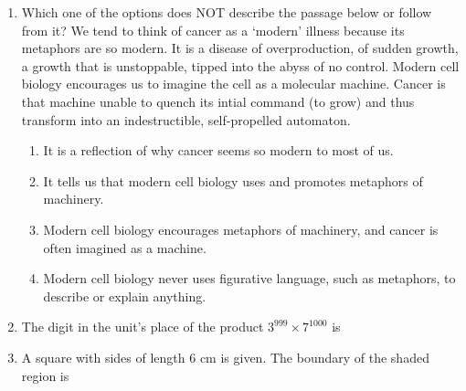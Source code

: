 \documentclass[12pt]{article}
\theoremstyle{remark}
\begin{document}
\begin{enumerate}
\begin{figure}[H]
\caption{}
\label{Fig:1.2}
\end{figure}
\begin{enumerate}  \end{enumerate}
\hfill{}
\item Which one of the options does NOT describe the passage below or follow from it? 
We tend to think of cancer as a ‘modern’ illness because its metaphors are
so modern. It is a disease of overproduction, of sudden growth, a growth
that is unstoppable, tipped into the abyss of no control. Modern cell biology
encourages us to imagine the cell as a molecular machine. Cancer is that
machine unable to quench its intial command (to grow) and thus transform
into an indestructible, self-propelled automaton. 
\begin{enumerate}
\item It is a reflection of why cancer seems so modern to most of us. 
\item It tells us that modern cell biology uses and promotes metaphors of machinery. 
\item Modern cell biology encourages metaphors of machinery, and cancer is often
imagined as a machine. 
\item Modern cell biology never uses figurative language, such as metaphors, to describe
or explain anything. 
\end{enumerate}
\hfill{}
\item The digit in the unit’s place of the product $3^{999}\times7^{1000}$ is 
\begin{enumerate}  \end{enumerate}
\hfill{}
\item A square with sides of length 6 cm is given. The boundary of the shaded region is

\end{enumerate}
\end{document}
